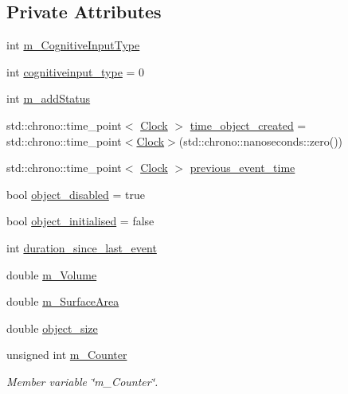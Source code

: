 \subsection*{Private Attributes}
\begin{DoxyCompactItemize}
\item 
int \mbox{\hyperlink{classCognitiveInput_a7158317a0651e93fde965e74988e4817}{m\+\_\+\+Cognitive\+Input\+Type}}
\item 
int \mbox{\hyperlink{classCognitiveInput_ab2edb814888d1bd68a44d0547cf23691}{cognitiveinput\+\_\+type}} = 0
\item 
int \mbox{\hyperlink{classCognitiveInput_acb5b53899d51052d7ec18ecd1386fa33}{m\+\_\+add\+Status}}
\item 
std\+::chrono\+::time\+\_\+point$<$ \mbox{\hyperlink{universe_8h_a0ef8d951d1ca5ab3cfaf7ab4c7a6fd80}{Clock}} $>$ \mbox{\hyperlink{classCognitiveInput_a5ad1f0f7523ebfb32d43556b0c94ca70}{time\+\_\+object\+\_\+created}} = std\+::chrono\+::time\+\_\+point$<$\mbox{\hyperlink{universe_8h_a0ef8d951d1ca5ab3cfaf7ab4c7a6fd80}{Clock}}$>$(std\+::chrono\+::nanoseconds\+::zero())
\item 
std\+::chrono\+::time\+\_\+point$<$ \mbox{\hyperlink{universe_8h_a0ef8d951d1ca5ab3cfaf7ab4c7a6fd80}{Clock}} $>$ \mbox{\hyperlink{classCognitiveInput_a34d8fede9de24f5046f301f5326b3511}{previous\+\_\+event\+\_\+time}}
\item 
bool \mbox{\hyperlink{classCognitiveInput_a57ce1ed5b887f4a0b2efb3b9fc5c407f}{object\+\_\+disabled}} = true
\item 
bool \mbox{\hyperlink{classCognitiveInput_aa60f8084d314063b5d32e4301f40ac37}{object\+\_\+initialised}} = false
\item 
int \mbox{\hyperlink{classCognitiveInput_a269476daa7243992fff92092007feff5}{duration\+\_\+since\+\_\+last\+\_\+event}}
\item 
double \mbox{\hyperlink{classCognitiveInput_ac9a4b7de6f0475f45ff198bd5d4e6ae0}{m\+\_\+\+Volume}}
\item 
double \mbox{\hyperlink{classCognitiveInput_a47ee2b439761b314062d946850cb852b}{m\+\_\+\+Surface\+Area}}
\item 
double \mbox{\hyperlink{classCognitiveInput_a51a23a86f14e2cb0e60f6df2d8d8494e}{object\+\_\+size}}
\item 
unsigned int \mbox{\hyperlink{classCognitiveInput_a2cc357e24354d7016953475c1bc66a98}{m\+\_\+\+Counter}}
\begin{DoxyCompactList}\small\item\em Member variable \char`\"{}m\+\_\+\+Counter\char`\"{}. \end{DoxyCompactList}\item 

\end{DoxyCompactItemize}
